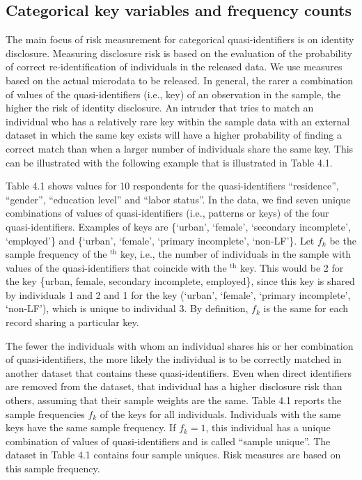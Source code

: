 \documentclass[letterpaper,10pt,english]{sphinxmanual}
\begin{document}
\subsection{Categorical key variables and frequency counts}
\label{\detokenize{measure_risk:categorical-key-variables-and-frequency-counts}}
The main focus of risk measurement for categorical quasi-identifiers is
on identity disclosure. Measuring disclosure risk is based on the
evaluation of the probability of correct re-identification of
individuals in the released data. We use measures based on the actual
microdata to be released. In general, the rarer a combination of values
of the quasi-identifiers (i.e., key) of an observation in the sample,
the higher the risk of identity disclosure. An intruder that tries to
match an individual who has a relatively rare key within the sample data
with an external dataset in which the same key exists will have a higher
probability of finding a correct match than when a larger number of
individuals share the same key. This can be illustrated with the
following example that is illustrated in Table 4.1.

Table 4.1 shows values for 10 respondents for the quasi-identifiers
“residence”, “gender”, “education level” and “labor status”. In the
data, we find seven unique combinations of values of quasi-identifiers
(i.e., patterns or keys) of the four quasi-identifiers. Examples of keys
are \{‘urban’, ‘female’, ‘secondary incomplete’, ‘employed’\} and
\{‘urban’, ‘female’, ‘primary incomplete’, ‘non-LF’\}. Let \(f_{k}\)
be the sample frequency of the $^{\text{th}}$ key, i.e., the number of
individuals in the sample with values of the quasi-identifiers that
coincide with the $^{\text{th}}$ key. This would be 2 for the key
\{urban, female, secondary incomplete, employed\}, since this key is
shared by individuals 1 and 2 and 1 for the key (‘urban’, ‘female’,
‘primary incomplete’, ‘non-LF’), which is unique to individual 3. By
definition, \(f_{k}\) is the same for each record sharing a
particular key.

The fewer the individuals with whom an individual shares his or her
combination of quasi-identifiers, the more likely the individual is to
be correctly matched in another dataset that contains these
quasi-identifiers. Even when direct identifiers are removed from the
dataset, that individual has a higher disclosure risk than others,
assuming that their sample weights are the same. Table 4.1 reports the
sample frequencies \(f_{k}\) of the keys for all individuals.
Individuals with the same keys have the same sample frequency. If
\(f_{k} = 1\), this individual has a unique combination of values of
quasi-identifiers and is called “sample unique”. The dataset in Table
4.1 contains four sample uniques. Risk measures are based on this sample
frequency.
\end{document}
